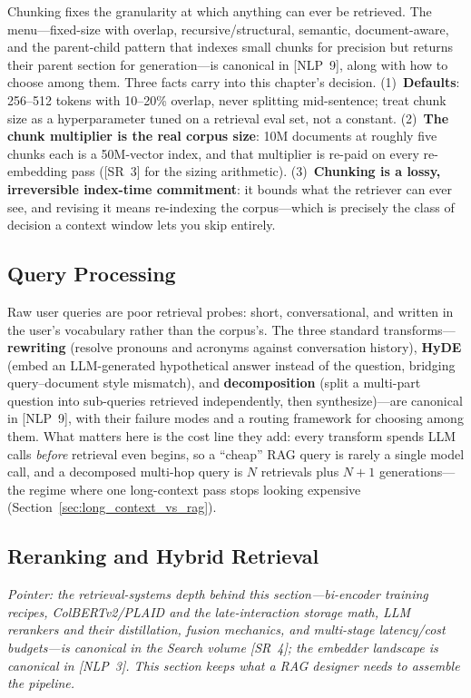 Chunking fixes the granularity at which anything can ever be retrieved. The menu---fixed-size with overlap, recursive/structural, semantic, document-aware, and the parent-child pattern that indexes small chunks for precision but returns their parent section for generation---is canonical in [NLP~9], along with how to choose among them. Three facts carry into this chapter's decision. (1)~\textbf{Defaults}: 256--512 tokens with 10--20\% overlap, never splitting mid-sentence; treat chunk size as a hyperparameter tuned on a retrieval eval set, not a constant. (2)~\textbf{The chunk multiplier is the real corpus size}: 10M documents at roughly five chunks each is a 50M-vector index, and that multiplier is re-paid on every re-embedding pass ([SR~3] for the sizing arithmetic). (3)~\textbf{Chunking is a lossy, irreversible index-time commitment}: it bounds what the retriever can ever see, and revising it means re-indexing the corpus---which is precisely the class of decision a context window lets you skip entirely.

\subsection{Query Processing}
\label{sec:query_processing}

Raw user queries are poor retrieval probes: short, conversational, and written in the user's vocabulary rather than the corpus's. The three standard transforms---\textbf{rewriting} (resolve pronouns and acronyms against conversation history), \textbf{HyDE} (embed an LLM-generated hypothetical answer instead of the question, bridging query--document style mismatch), and \textbf{decomposition} (split a multi-part question into sub-queries retrieved independently, then synthesize)---are canonical in [NLP~9], with their failure modes and a routing framework for choosing among them. What matters here is the cost line they add: every transform spends LLM calls \emph{before} retrieval even begins, so a ``cheap'' RAG query is rarely a single model call, and a decomposed multi-hop query is $N$ retrievals plus $N{+}1$ generations---the regime where one long-context pass stops looking expensive (Section~\ref{sec:long_context_vs_rag}).

\subsection{Reranking and Hybrid Retrieval}
\label{sec:reranking}

\textit{Pointer: the retrieval-systems depth behind this section---bi-encoder training recipes, ColBERTv2/PLAID and the late-interaction storage math, LLM rerankers and their distillation, fusion mechanics, and multi-stage latency/cost budgets---is canonical in the Search volume [SR~4]; the embedder landscape is canonical in [NLP~3]. This section keeps what a RAG designer needs to assemble the pipeline.}

